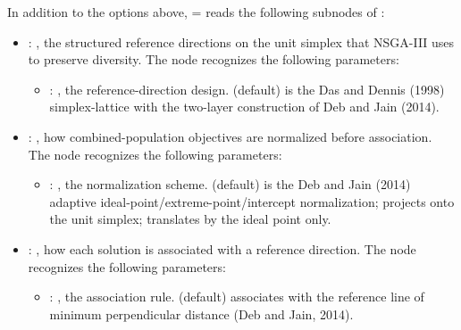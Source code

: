   In addition to the options above, = reads the following subnodes of :
  \begin{itemize}
    \item {}: ,
      the structured reference directions on the unit simplex that NSGA-III uses to
      preserve diversity.
      The  node recognizes the following parameters:
        \begin{itemize}
          \item {}: ,
            the reference-direction design.  (default) is the Das and Dennis
            (1998) simplex-lattice with the two-layer construction of Deb and Jain (2014).
      \end{itemize}

    \item {}: ,
      how combined-population objectives are normalized before association.
      The  node recognizes the following parameters:
        \begin{itemize}
          \item {}: ,
            the normalization scheme.  (default) is the Deb and Jain
            (2014) adaptive ideal-point/extreme-point/intercept normalization;
             projects onto the unit simplex;  translates
            by the ideal point only.
      \end{itemize}

    \item {}: ,
      how each solution is associated with a reference direction.
      The  node recognizes the following parameters:
        \begin{itemize}
          \item {}: ,
            the association rule.  (default) associates with the
            reference line of minimum perpendicular distance (Deb and Jain, 2014).
      \end{itemize}


\end{itemize}
